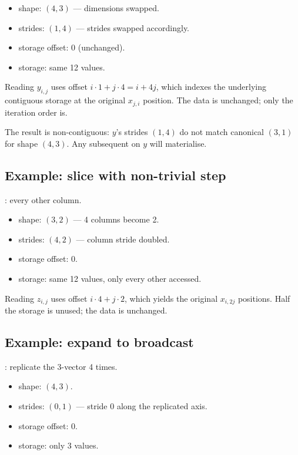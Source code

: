 \begin{itemize}
  \item shape: $(4, 3)$ --- dimensions swapped.
  \item strides: $(1, 4)$ --- strides swapped accordingly.
  \item storage offset: 0 (unchanged).
  \item storage: same 12 values.
\end{itemize}

Reading $y_{i,j}$ uses offset $i \cdot 1 + j \cdot 4 = i + 4j$, which
indexes the underlying contiguous storage at the original
$x_{j, i}$ position. The data is unchanged; only the iteration
order is.

The result is non-contiguous: $y$'s strides $(1, 4)$ do not match
canonical $(3, 1)$ for shape $(4, 3)$. Any subsequent
 on $y$ will materialise.

\subsection{Example: slice with non-trivial step}
\label{ssec:shape_view:slice_example}

: every other column.

\begin{itemize}
  \item shape: $(3, 2)$ --- 4 columns become 2.
  \item strides: $(4, 2)$ --- column stride doubled.
  \item storage offset: 0.
  \item storage: same 12 values, only every other accessed.
\end{itemize}

Reading $z_{i,j}$ uses offset $i \cdot 4 + j \cdot 2$, which
yields the original $x_{i, 2j}$ positions. Half the storage is
unused; the data is unchanged.

\subsection{Example: expand to broadcast}
\label{ssec:shape_view:expand_example}

: replicate
the 3-vector 4 times.

\begin{itemize}
  \item shape: $(4, 3)$.
  \item strides: $(0, 1)$ --- stride 0 along the replicated axis.
  \item storage offset: 0.
  \item storage: only 3 values.
\end{itemize}

